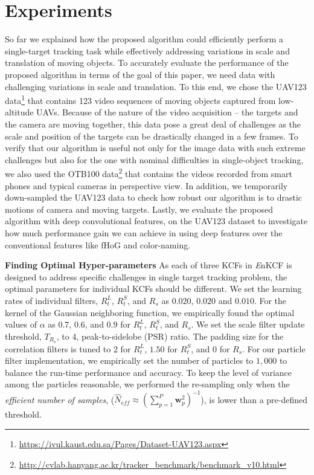 \documentclass[10pt,twocolumn,letterpaper]{article}
\begin{document}
\section{Experiments} \label{sc:Experiments}
So far we explained how the proposed algorithm could efficiently
perform a single-target tracking task while effectively addressing
variations in scale and translation of moving objects. To accurately
evaluate the performance of the proposed algorithm in terms of the
goal of this paper, we need data with challenging variations in scale
and translation. To this end, we chose the UAV123
data\footnote{\url{https://ivul.kaust.edu.sa/Pages/Dataset-UAV123.aspx}}\cite{mueller2016uav123}
that contains 123 video sequences of moving objects captured from
low-altitude UAVs. Because of the nature of the video acquisition --
the targets and the camera are moving together, this data pose a great
deal of challenges as the scale and position of the targets can be
drastically changed in a few frames. To verify that our algorithm is
useful not only for the image data with such extreme challenges but
also for the one with nominal difficulties in single-object tracking,
we also used the OTB100
data\footnote{\url{http://cvlab.hanyang.ac.kr/tracker_benchmark/benchmark_v10.html}}
that contains the videos recorded from smart phones and typical
cameras in perspective view. In addition, we temporarily down-sampled
the UAV123 data to check how robust our algorithm is to drastic
motions of camera and moving targets. Lastly, we evaluate the proposed
algorithm with deep convolutional features, on the UAV123 dataset to
investigate how much performance gain we can achieve in using deep
features over the conventional features like fHoG and color-naming.

\textbf{Finding Optimal Hyper-parameters} As each of three KCFs in
       {\it E}nKCF is designed to address specific challenges in
       single target tracking problem, the optimal parameters for
       individual KCFs should be different. We set the learning rates
       of individual filters, $R_{t}^{L}$, $R_{t}^{S}$, and $R_{s}$ as
       $0.020$, $0.020$ and $0.010$. For the kernel of the Gaussian
       neighboring function, we empirically found the optimal values
       of $\alpha$ as $0.7$, $0.6$, and $0.9$ for $R_{t}^{L}$,
       $R_{t}^{S}$, and $R_{s}$. We set the scale filter update
       threshold, $T_{R_{s}}$, to 4, peak-to-sidelobe (PSR) ratio. The
       padding size for the correlation filters is tuned to $2$ for
       $R_{t}^{L}$, $1.50$ for $R_{t}^{S}$, and $0$ for $R_{s}$. For
       our particle filter implementation, we empirically set the
       number of particles to $1,000$ to balance the run-time
       performance and accuracy. To keep the level of variance among
       the particles reasonable, we performed the re-sampling only
       when the \textit{efficient number of samples}, ($ \hat{N}_{eff}
       \approx (\sum_{p=1}^{P}\mathbf{w}_{p}^{2})^{-1} $), is lower
       than a pre-defined threshold.
\end{document}
